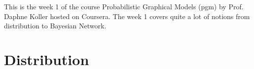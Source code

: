This is the week 1 of the course Probabilistic Graphical Models (pgm) by Prof. Daphne Koller hosted on Coursera. The week 1 covers quite a lot of notions from distribution to Bayesian Network.

\section{Distribution}
